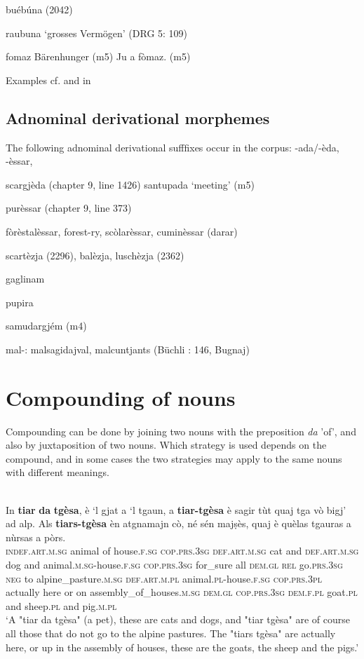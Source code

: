 buébúna (2042)

raubuna `grosses Vermögen' (DRG 5: 109)

fomaz Bärenhunger (m5)
Ju a fòmaz. (m5)

{\color{red}
Examples cf.  and in 
}

\subsection{Adnominal derivational morphemes}
The following adnominal derivational sufffixes occur in the corpus: -ada/-èda, -èssar, 


scargjèda (chapter 9, line 1426)
santupada `meeting' (m5)

purèssar (chapter 9, line 373)

fòrèstalèssar, forest-ry, scòlarèssar, cuminèssar (darar)

scartèzja (2296), balèzja, luschèzja (2362)

gaglinam 

pupira

samudargjém (m4)

mal-: malsagidajval, malcuntjants (Büchli : 146, Bugnaj)

\section{Compounding of nouns}
Compounding can be done by joining two nouns with the preposition \textit{da} 'of', and also by juxtaposition of two nouns. Which strategy is used depends on the compound, and in some cases the two strategies may apply to the same nouns with different meanings.


\ea\label{ex::}
\\
\gll  In \textbf{tiar} \textbf{da} \textbf{tgèsa}, è `l gjat a `l tgaun, a \textbf{tiar-tgèsa} è sagir tùt quaj tga vò bigj’ ad alp. Als \textbf{tiars-tgèsa} èn atgnamajn cò, né sén majṣès, quaj è quèlas tgauras a nùrsas a pòrs.  \\
     \textsc{indef.art.m.sg} animal of house.\textsc{f.sg} \textsc{cop.prs.3sg} \textsc{def.art.m.sg} cat and \textsc{def.art.m.sg} dog  and animal.\textsc{m.sg}-house.\textsc{f.sg} \textsc{cop.prs.3sg} for\_sure all \textsc{dem.gl} \textsc{rel} go.\textsc{prs.3sg} \textsc{neg} to alpine\_pasture.\textsc{m.sg} \textsc{def.art.m.pl} animal.\textsc{pl}-house.\textsc{f.sg} \textsc{cop.prs.3pl} actually here or on assembly\_of\_houses.\textsc{m.sg} \textsc{dem.gl} \textsc{cop.prs.3sg} \textsc{dem.f.pl} goat.\textsc{pl} and sheep.\textsc{pl} and pig.\textsc{m.pl}\\
\glt `A "tiar da tgèsa" (a pet), these are cats and dogs, and "tiar tgèsa" are of course all those that do not go to the alpine pastures. The "tiars tgèsa" are actually here, or up in the assembly of houses, these are the goats, the sheep and the pigs.'
\z



